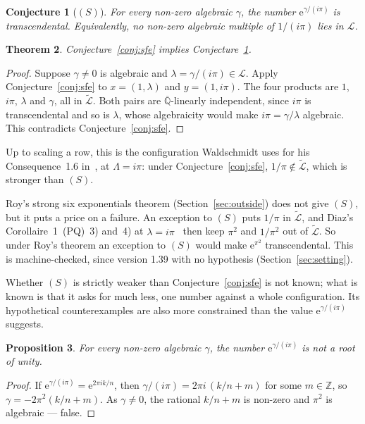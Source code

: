 \documentclass[11pt,a4paper]{article}
\theoremstyle{plain}
\newtheorem{theorem}{Theorem}[section]
\newtheorem{conjecture}[theorem]{Conjecture}
\newtheorem{proposition}[theorem]{Proposition}
\theoremstyle{definition}
\newcommand{\e}{\mathrm{e}}
\newcommand{\Z}{\mathbb{Z}}
\newcommand{\Alg}{\overline{\mathbb{Q}}}
\newcommand{\Logs}{\mathcal{L}}
\newcommand{\aLogs}{\widetilde{\mathcal{L}}}
\begin{document}
\begin{conjecture}[$(S)$]\label{conj:S}
For every non-zero algebraic $\gamma$, the number $\e^{\gamma/(i\pi)}$ is transcendental.
Equivalently, no non-zero algebraic multiple of $1/(i\pi)$ lies in $\Logs$.
\end{conjecture}

\begin{theorem}\label{thm:S-of-sfe}
Conjecture~\ref{conj:sfe} implies Conjecture~\ref{conj:S}.
\end{theorem}

\begin{proof}
Suppose $\gamma\neq0$ is algebraic and $\lambda=\gamma/(i\pi)\in\Logs$. Apply
Conjecture~\ref{conj:sfe} to $x=(1,\lambda)$ and $y=(1,i\pi)$. The four products are
$1$, $i\pi$, $\lambda$ and $\gamma$, all in $\aLogs$. Both pairs are $\Alg$-linearly independent,
since $i\pi$ is transcendental and so is $\lambda$, whose algebraicity would make
$i\pi=\gamma/\lambda$ algebraic. This contradicts Conjecture~\ref{conj:sfe}.
\end{proof}

Up to scaling a row, this is the configuration Waldschmidt uses for his Consequence~1.6
in~\cite{waldschmidt-2005a}, at $\Lambda=i\pi$: under Conjecture~\ref{conj:sfe}, $1/\pi\notin\aLogs$,
which is stronger than $(S)$.

Roy's strong six exponentials theorem (Section~\ref{sec:outside}) does not give $(S)$, but it puts
a price on a failure. An exception to $(S)$ puts $1/\pi$ in $\aLogs$, and Diaz's
Corollaire~1~(PQ)~3) and~4) at $\lambda=i\pi$~\cite[p.~380]{diaz-2007} then keep $\pi^{2}$ and
$1/\pi^{2}$ out of $\aLogs$. So under Roy's theorem an exception to $(S)$ would make $\e^{\pi^{2}}$
transcendental. This is machine-checked, since version 1.39 with no hypothesis
(Section~\ref{sec:setting}).

Whether $(S)$ is strictly weaker than Conjecture~\ref{conj:sfe} is not known; what is known is that
it asks for much less, one number against a whole configuration. Its hypothetical counterexamples
are also more constrained than the value $\e^{\gamma/(i\pi)}$ suggests.

\begin{proposition}\label{prop:root-of-unity}
For every non-zero algebraic $\gamma$, the number $\e^{\gamma/(i\pi)}$ is not a root of unity.
\end{proposition}

\begin{proof}
If $\e^{\gamma/(i\pi)}=\e^{2\pi ik/n}$, then $\gamma/(i\pi)=2\pi i\,(k/n+m)$ for some $m\in\Z$, so
$\gamma=-2\pi^{2}(k/n+m)$. As $\gamma\neq0$, the rational $k/n+m$ is non-zero and $\pi^{2}$ is
algebraic --- false.
\end{proof}
\end{document}

